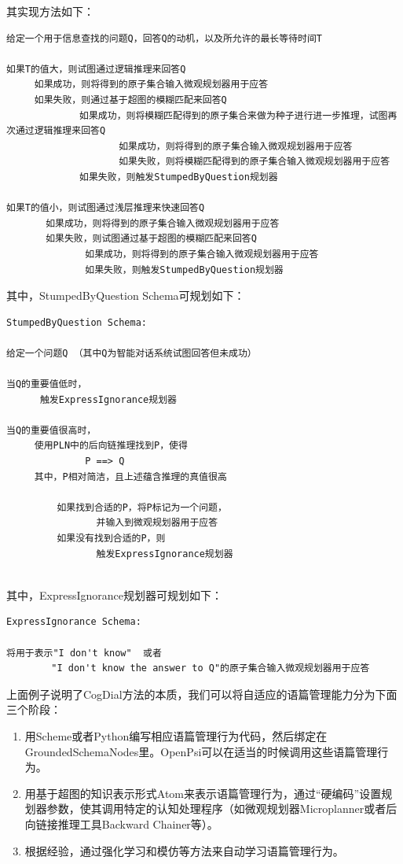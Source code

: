 其实现方法如下：

\begin{verbatim}
给定一个用于信息查找的问题Q，回答Q的动机，以及所允许的最长等待时间T

如果T的值大，则试图通过逻辑推理来回答Q
     如果成功，则将得到的原子集合输入微观规划器用于应答
     如果失败，则通过基于超图的模糊匹配来回答Q
             如果成功，则将模糊匹配得到的原子集合来做为种子进行进一步推理，试图再次通过逻辑推理来回答Q
                    如果成功，则将得到的原子集合输入微观规划器用于应答
                    如果失败，则将模糊匹配得到的原子集合输入微观规划器用于应答
             如果失败，则触发StumpedByQuestion规划器

如果T的值小，则试图通过浅层推理来快速回答Q
       如果成功，则将得到的原子集合输入微观规划器用于应答
       如果失败，则试图通过基于超图的模糊匹配来回答Q
              如果成功，则将得到的原子集合输入微观规划器用于应答
              如果失败，则触发StumpedByQuestion规划器

\end{verbatim}

\noindent 其中，StumpedByQuestion Schema可规划如下：

\begin{verbatim}
StumpedByQuestion Schema:

给定一个问题Q （其中Q为智能对话系统试图回答但未成功）

当Q的重要值低时，
      触发ExpressIgnorance规划器
				
当Q的重要值很高时，
     使用PLN中的后向链推理找到P，使得
              P ==> Q
     其中，P相对简洁，且上述蕴含推理的真值很高

         如果找到合适的P，将P标记为一个问题，
                并输入到微观规划器用于应答
         如果没有找到合适的P，则
                触发ExpressIgnorance规划器
		

\end{verbatim}

\noindent 其中，ExpressIgnorance规划器可规划如下：

\begin{verbatim}
ExpressIgnorance Schema:

将用于表示"I don't know"  或者
        "I don't know the answer to Q"的原子集合输入微观规划器用于应答
\end{verbatim}

上面例子说明了CogDial方法的本质，我们可以将自适应的语篇管理能力分为下面三个阶段：

\begin{enumerate}
\item 用Scheme或者Python编写相应语篇管理行为代码，然后绑定在GroundedSchemaNodes里。OpenPsi可以在适当的时候调用这些语篇管理行为。
\item 用基于超图的知识表示形式Atom来表示语篇管理行为，通过“硬编码”设置规划器参数，使其调用特定的认知处理程序（如微观规划器Microplanner或者后向链接推理工具Backward Chainer等）。
\item 根据经验，通过强化学习和模仿等方法来自动学习语篇管理行为。
\end{enumerate}

